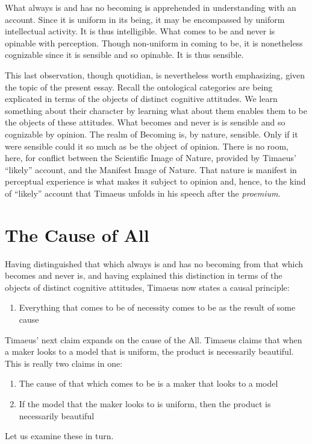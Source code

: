 What always is and has no becoming is apprehended in understanding with an account. Since it is uniform in its being, it may be encompassed by uniform intellectual activity. It is thus intelligible. What comes to be and never is opinable with perception. Though non-uniform in coming to be, it is nonetheless cognizable since it is sensible and so opinable. It is thus sensible.

This last observation, though quotidian, is nevertheless worth emphasizing, given the topic of the present essay. Recall the ontological categories are being explicated in terms of the objects of distinct cognitive attitudes. We learn something about their character by learning what about them enables them to be the objects of these attitudes. What becomes and never is is sensible and so cognizable by opinion. The realm of Becoming is, by nature, sensible. Only if it were sensible could it so much as be the object of opinion. There is no room, here, for conflict between the Scientific Image of Nature, provided by Timaeus' ``likely'' account, and the Manifest Image of Nature. That nature is manifest in perceptual experience is what makes it subject to opinion and, hence, to the kind of ``likely'' account that Timaeus unfolds in his speech after the \emph{proemium}.


\section{The Cause of All} %
\label{sec:the_cause_of_all}

Having distinguished that which always is and has no becoming from that which becomes and never is, and having explained this distinction in terms of the objects of distinct cognitive attitudes, Timaeus now states a causal principle:
\begin{enumerate}[(1)]
	\item Everything that comes to be of necessity comes to be as the result of some cause
\end{enumerate}
Timaeus' next claim expands on the cause of the All. Timaeus claims that when a maker looks to a model that is uniform, the product is necessarily beautiful. This is really two claims in one:
\begin{enumerate}[(1)]\addtocounter{enumi}{1}
	\item The cause of that which comes to be is a maker that looks to a model
	\item If the model that the maker looks to is uniform, then the product is necessarily beautiful
\end{enumerate}
Let us examine these in turn.

